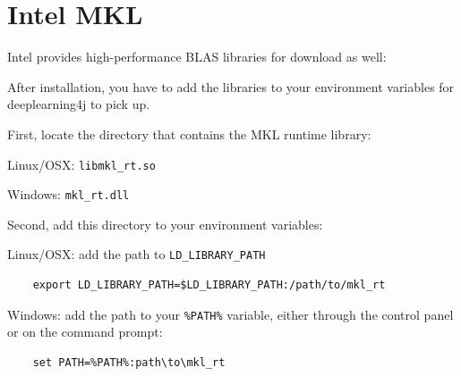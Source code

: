 \documentclass[a4paper]{book}
\begin{document}
\chapter{Intel MKL}
Intel provides high-performance BLAS libraries for download as well\cite{mkl}:

After installation, you have to add the libraries to your environment
variables for deeplearning4j to pick up.

\noindent First, locate the directory that contains the MKL runtime library:
\begin{tight_itemize}
  \item Linux/OSX: \texttt{libmkl\_rt.so}
  \item Windows: \texttt{mkl\_rt.dll}
\end{tight_itemize}

\noindent Second, add this directory to your environment variables:
\begin{tight_itemize}
  \item Linux/OSX: add the path to \texttt{LD\_LIBRARY\_PATH}
    \begin{verbatim}
    export LD_LIBRARY_PATH=$LD_LIBRARY_PATH:/path/to/mkl_rt
    \end{verbatim}
  \item Windows: add the path to your \texttt{\%PATH\%} variable, either
  through the control panel or on the command prompt:
    \begin{verbatim}
    set PATH=%PATH%:path\to\mkl_rt
    \end{verbatim}
\end{tight_itemize}



\end{document}
